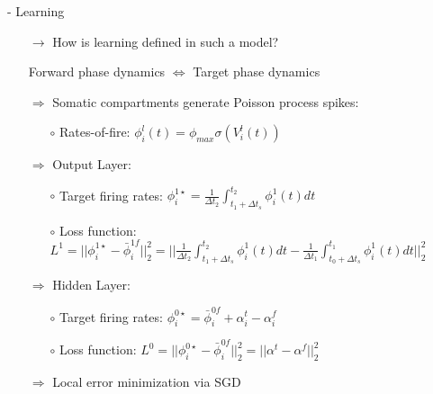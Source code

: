 \documentclass[dvipsnames, usenames]{beamer}
\begin{document}
\begin{frame}{\citet{guerguiev2017} - Learning}

\begin{itemize}
	\item[$\to$] How is learning defined in such a model?
	\begin{tcolorbox}

	Forward phase dynamics $\Leftrightarrow$ Target phase dynamics  
	\end{tcolorbox}
	\pause
	\item[$\Rightarrow$] Somatic compartments generate Poisson process spikes:
	\begin{itemize}
		\item[$\circ$] Rates-of-fire: $\phi^l_i(t) = \phi_{max} \sigma(V_i^l(t))$
	\end{itemize}
	\pause
	\item[$\Rightarrow$] Output Layer:
	\begin{itemize}
		\item[$\circ$] Target firing rates: $\phi_i^{1\star} = \frac{1}{\Delta t_2} \int_{t_1 + \Delta t_s}^{t_2} \phi_i^1(t)dt$
		\item[$\circ$] Loss function: $L^1 = ||\phi_i^{1\star} - \bar{\phi}_i^{1f}||_2^2 = ||\frac{1}{\Delta t_2} \int_{t_1 + \Delta t_s}^{t_2} \phi_i^1(t)dt - \frac{1}{\Delta t_1} \int_{t_0 + \Delta t_s}^{t_1} \phi_i^1(t)dt||_2^2$
	\end{itemize}
	\vspace{0.5cm}
	\pause
	\item[$\Rightarrow$] Hidden Layer:
	\begin{itemize}
		\item[$\circ$] Target firing rates: $\phi_i^{0\star} = \bar{\phi}_i^{0f} + \alpha_i^t - \alpha_i^f$
		\item[$\circ$] Loss function: $L^0 = ||\phi_i^{0\star} - \bar{\phi}_i^{0f}||_2^2 = ||\alpha^t - \alpha^f||_2^2$
	\end{itemize}
	\vspace{0.5cm}
	\pause
	\item[$\Rightarrow$] Local error minimization via SGD
\end{itemize}
\end{frame}

\end{document}
